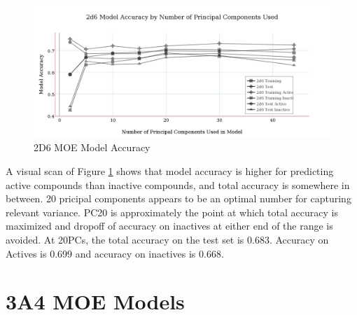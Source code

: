 \begin{figure}[H]
\includegraphics[width=1\textwidth]{../img/2d6_moe_model_accuracy.png}
\caption{2D6 MOE Model Accuracy}
\label{fig:2d6}
\end{figure}

A visual scan of Figure \ref{fig:2d6} shows that model accuracy is higher for predicting active compounds than inactive compounds, and total accuracy is somewhere in between. 20 pricipal components appears to be an optimal number for capturing relevant variance.
PC20 is approximately the point at which total accuracy is maximized and dropoff of accuracy on inactives at either end of the range is avoided.
At 20PCs, the total accuracy on the test set is 0.683. Accuracy on Actives is 0.699 and accuracy on inactives is 0.668.


\section{3A4 MOE Models}

